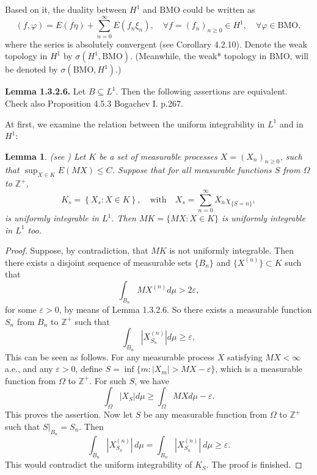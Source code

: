 \documentclass[reqno]{amsart}
\newtheorem{lem}[thm]{Lemma}
\numberwithin{equation}{section}
\begin{document}
Based on it, the duality between $H^{1}$ and $\text{BMO}$ could be written as
\[
(f, \varphi) = E(f\eta) + \sum_{n=0}^{\infty} E(f_{n}\xi_{n}), \quad \forall f = (f_{n})_{n\geq 0} \in H^{1}, \quad \forall \varphi \in \text{BMO}, 
\]
where the series is absolutely convergent (see Corollary 4.2.10). Denote the weak topology in $H^{1}$ by $\sigma(H^{1}, \text{BMO})$. (Meanwhile, the weak* topology in $\text{BMO}$, will be denoted by $\sigma(\text{BMO}, H^{1})$.)


\textbf{Lemma 1.3.2.6.} Let $B \subseteq L^1$. Then the following assertions are equivalent.
Check also Proposition 4.5.3 Bogachev I. p.267.

At first, we examine the relation between the uniform integrability in $L^{1}$ and in $H^{1}$:

\begin{lem}(see \cite[Lemma 2.6.1]{Long})
Let ${K}$ be a set of measurable processes $X = (X_{n})_{n\geq 0}$, such that $\sup_{X\in K} {E}(M X) \leq C$. Suppose that for all measurable functions $S$ from $\Omega$ to $\mathbb{Z}^{+}$,
\[
{K}_{s} = \left\{ X_{s} : X \in K \right\}, \quad \text{with} \quad X_{s} = \sum_{n=0}^{\infty} X_{n} \chi_{\{S=n\}},
\]
is uniformly integrable in $L^{1}$. Then $M{K} = \{M X: X \in {K}\}$ is uniformly integrable in $L^{1}$ too.  
\end{lem}

\begin{proof} Suppose, by contradiction, that $M{K}$ is not uniformly integrable. Then there exists a disjoint sequence of measurable sets $\{B_{n}\}$ and $\{X^{(n)}\} \subset {K}$ such that
\[
\int_{B_{n}} MX^{(n)}  d\mu > 2\varepsilon,
\]
for some $\varepsilon > 0$, by means of Lemma 1.3.2.6. So there exists a measurable function $S_{n}$ from $B_{n}$ to $\mathbb{Z}^{+}$ such that
\[
\int_{B_{n}} |X^{(n)}_{S_n}|  d\mu \ge \varepsilon,
\]
This can be seen as follows. For any measurable process $X$ satisfying $M X < \infty$ a.e., and any $\varepsilon > 0$, define $S = \inf\{m : |X_{m}| > M X - \varepsilon\}$, which is a measurable function from $\Omega$ to $\mathbb{Z}^{+}$. For such $S$, we have
$$\int_\Omega |X_S| d\mu \ge \int_\Omega M Xd\mu -\varepsilon.$$
This proves the assertion. Now let $S$ be any measurable function from $\Omega$ to $\mathbb{Z}^{+}$ such that $S|_{B_n} = S_{n}$. Then
\[
\int_{B_{n}} |X_{S_{n}}^{(n)}| \, d\mu = \int_{B_{n}} |X_{S_{n}}^{(n)}| \ d\mu \ge \varepsilon.
\]
This would contradict the uniform integrability of ${K}_S$. The proof is finished.
\end{proof}
\end{document}
